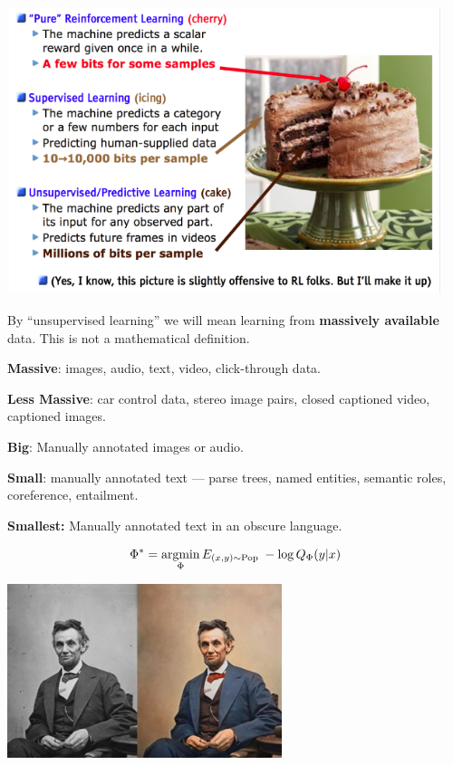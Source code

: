 {

\centerline{\includegraphics[width = 8in]{../images/cake}}



By ``unsupervised learning'' we will mean learning from {\bf massively available} data.  This is not a mathematical definition.

\vfill
{\bf Massive}: images, audio, text, video, click-through data.

\vfill
{\bf Less Massive}: car control data, stereo image pairs, closed captioned video, captioned images.

\vfill
{\bf Big}: Manually annotated images or audio.

\vfill
{\bf Small}: manually annotated text --- parse trees, named entities, semantic roles, coreference, entailment.

\vfill
{\bf Smallest:} Manually annotated text in an obscure language.


$$\Phi^* = \operatorname*{argmin}_\Phi E_{(x,y) \sim \mathrm{Pop}}\;-\log Q_\Phi(y|x)$$

\vfill
\centerline{\includegraphics[height=2in]{../images/Colorization}}

}
